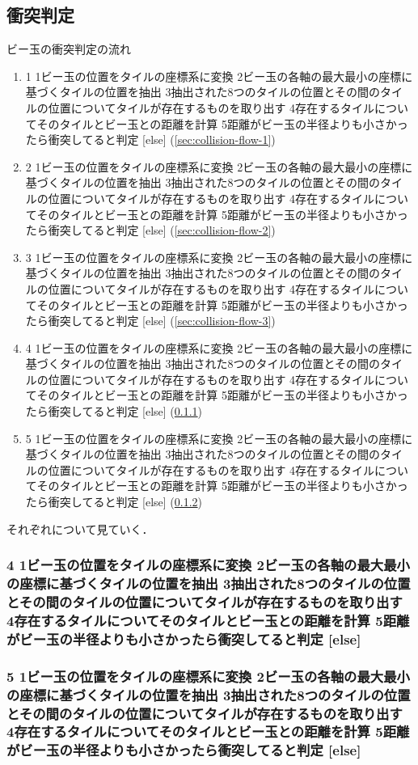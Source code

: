 
{%
\makeatletter

\newcommand{\sec@collision@flow}[1]{%
  \stringcases
    {#1}%
    {%
      {1}{ビー玉の位置をタイルの座標系に変換}%
      {2}{ビー玉の各軸の最大最小の座標に基づくタイルの位置を抽出}%
      {3}{抽出された8つのタイルの位置とその間のタイルの位置についてタイルが存在するものを取り出す}%
      {4}{存在するタイルについてそのタイルとビー玉との距離を計算}%
      {5}{距離がビー玉の半径よりも小さかったら衝突してると判定}%
    }%
    {[else]}%
}

\newcommand{\e}{\bm{e}}

\newcommand{\e@x}{\e_x}
\newcommand{\e@y}{\e_y}
\newcommand{\e@z}{\e_z}

\newcommand{\e@tile}{\e^\prime}
\newcommand{\e@tile@x}{\e@tile_x}
\newcommand{\e@tile@y}{\e@tile_y}
\newcommand{\e@tile@z}{\e@tile_z}

\newcommand{\O@tile}{{\rm O}^\prime}
\newcommand{\x@tile}{x^\prime}
\newcommand{\y@tile}{y^\prime}
\newcommand{\z@tile}{z^\prime}

\newcommand{\v@O@tile}{\bm{v}_{\O@tile}}

\newcommand{\v@P}{\bm{v}_{\rm P}}
\newcommand{\v@tile@P}{\bm{v}^\prime_{\rm P}}
\subsection{衝突判定}

\begin{center}
  
\end{center}

ビー玉の衝突判定の流れ

\begin{enumerate}
  \item \sec@collision@flow{1} (\ref{sec:collision-flow-1})
  \item \sec@collision@flow{2} (\ref{sec:collision-flow-2})
  \item \sec@collision@flow{3} (\ref{sec:collision-flow-3})
  \item \sec@collision@flow{4} (\ref{sec:collision-flow-4})
  \item \sec@collision@flow{5} (\ref{sec:collision-flow-5})
\end{enumerate}

それぞれについて見ていく．






\subsubsection{\sec@collision@flow{4}}
\label{sec:collision-flow-4}

\subsubsection{\sec@collision@flow{5}}
\label{sec:collision-flow-5}

\makeatother
}
